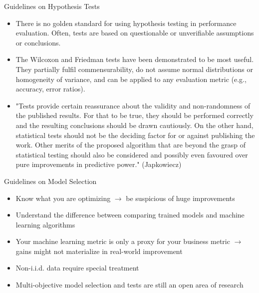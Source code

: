 \documentclass[11pt,compress,t,notes=noshow, xcolor=table]{beamer}
\begin{document}
\begin{frame}{Guidelines on Hypothesis Tests}

\vfill
\begin{itemize}
    \item There is no golden standard for using hypothesis testing in performance evaluation. Often, tests are based on questionable or unverifiable assumptions or conclusions.
    \item The Wilcoxon and Friedman tests have been demonstrated to be most useful. They partially fulfil commensurability, do not assume normal distributions or homogeneity of variance, and can be applied to any evaluation metric (e.g., accuracy, error ratios).
    \item  "Tests provide certain reassurance about the validity and non-randomness of the published  results. For that to be true, they should be performed correctly and the resulting conclusions should  be drawn cautiously. On the other hand, statistical tests should not be the deciding factor for or  against publishing the work. Other merits of the proposed algorithm that are beyond the grasp of  statistical testing should also be considered and possibly even favoured over pure improvements in  predictive power." (Japkowiecz)
\end{itemize}
\vfill

\end{frame}

\begin{frame}{Guidelines on Model Selection}
    \vfill
    \begin{itemize}
        \item Know what you are optimizing $\rightarrow$ be suspicious of huge improvements
        \item Understand the difference between comparing trained models and machine learning algorithms
        \item Your machine learning metric is only a proxy for your business metric $\rightarrow$ gains might not materialize in real-world improvement
        \item Non-i.i.d. data require special treatment
        \item Multi-objective model selection and tests are still an open area of research
    \end{itemize}
    \vfill
\end{frame}


\endlecture
\end{document}
